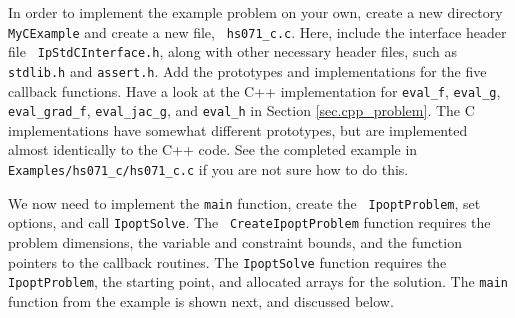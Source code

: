 \documentclass[letter,10pt]{article}
\begin{document}
\vspace{\baselineskip}

In order to implement the example problem on your own, create a new
directory {\tt MyCExample} and create a new file, {\tt
  hs071\_c.c}.  Here, include the interface header file {\tt
  IpStdCInterface.h}, along with other necessary header files, such as
{\tt stdlib.h} and {\tt assert.h}.  Add the prototypes and
implementations for the five callback functions.  Have a look at the
C++ implementation for {\tt eval\_f}, {\tt eval\_g}, {\tt
  eval\_grad\_f}, {\tt eval\_jac\_g}, and {\tt eval\_h} in Section
\ref{sec.cpp_problem}. The C implementations have somewhat different
prototypes, but are implemented almost identically to the C++ code.
See the completed example in {\tt Examples/hs071\_c/hs071\_c.c} if you
are not sure how to do this.

We now need to implement the {\tt main} function, create the {\tt
  IpoptProblem}, set options, and call {\tt IpoptSolve}. The {\tt
  CreateIpoptProblem} function requires the problem dimensions, the
variable and constraint bounds, and the function pointers to the
callback routines. The {\tt IpoptSolve} function requires the {\tt
  IpoptProblem}, the starting point, and allocated arrays for the
solution.  The {\tt main} function from the example is shown next, and
discussed below.
\end{document}
